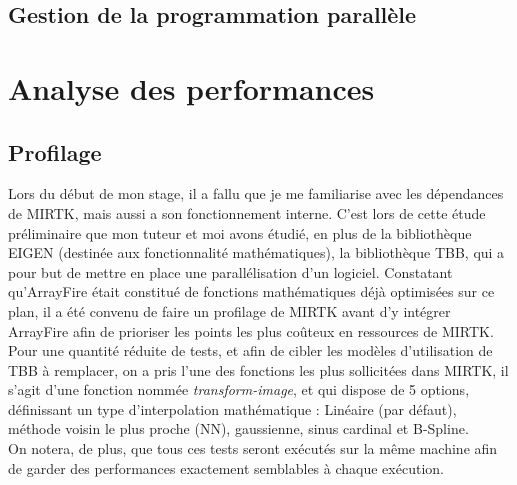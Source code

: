\documentclass[10pt]{report}
\begin{document}
	\subsection{Gestion de la programmation parallèle}
	
	
	
	
	
	\section{Analyse des performances}
		\subsection{Profilage}
		Lors du début de mon stage, il a fallu que je me familiarise avec les dépendances de MIRTK, mais aussi a son fonctionnement interne. C'est lors de cette étude préliminaire que mon tuteur et moi avons étudié, en plus de la bibliothèque EIGEN (destinée aux fonctionnalité mathématiques), la bibliothèque TBB, qui a pour but de mettre en place une parallélisation d'un logiciel. Constatant qu'ArrayFire était constitué de fonctions mathématiques déjà optimisées sur ce plan, il a été convenu de faire un profilage de MIRTK avant d'y intégrer ArrayFire afin de prioriser les points les plus coûteux en ressources de MIRTK. \\
		Pour une quantité réduite de tests, et afin de cibler les modèles d'utilisation de TBB à remplacer, on a pris l'une des fonctions les plus sollicitées dans MIRTK, il s'agit d'une fonction nommée \textit{transform-image}, et qui dispose de 5 options, définissant un type d'interpolation mathématique : Linéaire (par défaut), méthode voisin le plus proche (NN), gaussienne, sinus cardinal et B-Spline. \\
		On notera, de plus, que tous ces tests seront exécutés sur la même machine afin de garder des performances exactement semblables à chaque exécution.
		
\end{document}
